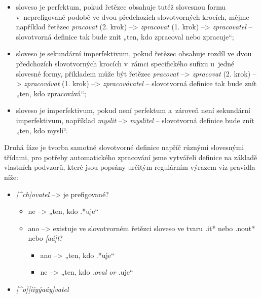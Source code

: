 \begin{itemize}
\tightlist
\item
  sloveso je perfektum, pokud řetězec obsahuje tutéž slovesnou formu
v~neprefigované podobě ve dvou předchozích slovotvorných krocích, mějme
  například řetězec \emph{pracovat} (2. krok) --\textgreater{}
  \emph{zpracovat} (1. krok) --\textgreater{} \emph{zpracovatel} --
  slovotvorná definice tak bude znít „ten, kdo zpracoval nebo
  zpracuje``;
\item
  sloveso je sekundární imperfektivum, pokud řetězec obsahuje rozdíl ve
  dvou předchozích slovotvorných krocích v~rámci specifického sufixu
u~jedné slovesné formy, příkladem může být řetězec \emph{pracovat}
  --\textgreater{} \emph{zpracovat} (2. krok) --\textgreater{}
  \emph{zpracovávat} (1. krok) --\textgreater{} \emph{zpracovávatel} --
  slovotvorná definice tak bude znít „ten, kdo zpracovává``;
\item
  sloveso je imperfektivum, pokud není perfektum a~zároveň není
  sekundární imperfektivum, například \emph{myslit} --\textgreater{}
  \emph{myslitel} -- slovotvorná definice bude znít „ten, kdo myslí``.
\end{itemize}

Druhá fáze je tvorba samotné slovotvorné definice napříč různými
slovesnými třídami, pro potřeby automatického zpracování jsme vytvářeli
definice na základě vlastních podvzorů, které jsou popsány určitým
regulárním výrazem viz pravidla níže:

\begin{itemize}
\tightlist
\item
  \emph{{[}\^{}ch{]}ovatel} --\textgreater{} je prefigované?

  \begin{itemize}
  \tightlist
  \item
    ne --\textgreater{} „ten, kdo .*uje``
  \item
    ano --\textgreater{} existuje ve slovotvorném řetězci sloveso ve
    tvaru \emph{.}it* nebo \emph{.}nout* nebo \emph{{[}aá{]}t}?

    \begin{itemize}
    \tightlist
    \item
      ano --\textgreater{} „ten, kdo .*uje``
    \item
      ne --\textgreater{} „ten, kdo .\emph{oval or .}uje``
    \end{itemize}
  \end{itemize}
\item
  \emph{{[}\^{}o{]}{[}iíyýaáy{]}vatel}
\end{itemize}
